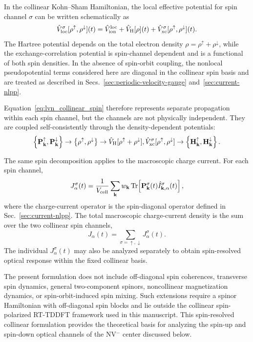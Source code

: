 In the collinear Kohn--Sham Hamiltonian, the local effective potential
for spin channel $\sigma$ can be written schematically as
\begin{equation}
  \hat V_{\rm loc}^{\sigma}
  [\rho^\uparrow,\rho^\downarrow](t)
  =
  \hat V_{\rm ion}^{\rm loc}
  +
  \hat V_{\rm H}[\rho](t)
  +
  \hat V_{\rm xc}^{\sigma}
  [\rho^\uparrow,\rho^\downarrow](t).
  \label{eq:vloc_collinear_spin}
\end{equation}
The Hartree potential depends on the total electron density
$\rho=\rho^\uparrow+\rho^\downarrow$, while the exchange-correlation
potential is spin-channel dependent and is a functional of both spin
densities.  In the absence of spin-orbit coupling, the nonlocal
pseudopotential terms considered here are diagonal in the collinear spin
basis and are treated as described in
Secs.~\ref{sec:periodic-velocity-gauge} and~\ref{sec:current-nlpp}.

Equation~\eqref{eq:lvn_collinear_spin} therefore represents separate
propagation within each spin channel, but the channels are not
physically independent.  They are coupled self-consistently through the
density-dependent potentials:
\begin{equation}
  \left\{
    \mathbf P_{\mathbf k}^{\uparrow},
    \mathbf P_{\mathbf k}^{\downarrow}
  \right\}
  \rightarrow
  \left\{
    \rho^\uparrow,
    \rho^\downarrow
  \right\}
  \rightarrow
  \hat V_{\rm H}[\rho^\uparrow+\rho^\downarrow],
  \hat V_{\rm xc}^{\sigma}[\rho^\uparrow,\rho^\downarrow]
  \rightarrow
  \left\{
    \mathbf H_{\mathbf k}^{\uparrow},
    \mathbf H_{\mathbf k}^{\downarrow}
  \right\}.
  \label{eq:collinear_spin_coupling_cycle}
\end{equation}

The same spin decomposition applies to the macroscopic charge current.
For each spin channel,
\begin{equation}
  J_\alpha^{\sigma}(t)
  =
  \frac{1}{V_{\rm cell}}
  \sum_{\mathbf k}
  w_{\mathbf k}\,
  {\rm Tr}\!
  \left[
    \mathbf P_{\mathbf k}^{\sigma}(t)
    \hat I_{\mathbf k,\alpha}^{\sigma}(t)
  \right],
  \label{eq:spin_resolved_current}
\end{equation}
where the charge-current operator is the spin-diagonal operator defined
in Sec.~\ref{sec:current-nlpp}.  The total macroscopic charge-current
density is the sum over the two collinear spin channels,
\begin{equation}
  J_\alpha(t)
  =
  \sum_{\sigma=\uparrow,\downarrow}
  J_\alpha^{\sigma}(t).
  \label{eq:total_current_spin_sum}
\end{equation}
The individual $J_\alpha^{\sigma}(t)$ may also be analyzed separately
to obtain spin-resolved optical response within the fixed collinear
basis.

The present formulation does not include off-diagonal spin coherences,
transverse spin dynamics, general two-component spinors, noncollinear
magnetization dynamics, or spin-orbit-induced spin mixing.  Such
extensions require a spinor Hamiltonian with off-diagonal spin blocks
and lie outside the collinear spin-polarized RT-TDDFT framework used in
this manuscript.  This spin-resolved collinear formulation provides the
theoretical basis for analyzing the spin-up and spin-down optical
channels of the NV$^{-}$ center discussed below.
